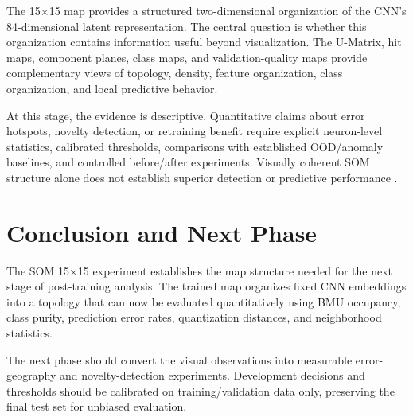\documentclass[11pt]{article}
\begin{document}
The 15$\times$15 map provides a structured two-dimensional organization of the
CNN's 84-dimensional latent representation. The central question is whether
this organization contains information useful beyond visualization. The
U-Matrix, hit maps, component planes, class maps, and validation-quality maps
provide complementary views of topology, density, feature organization, class
organization, and local predictive behavior.

At this stage, the evidence is descriptive. Quantitative claims about error
hotspots, novelty detection, or retraining benefit require explicit neuron-level
statistics, calibrated thresholds, comparisons with established OOD/anomaly
baselines, and controlled before/after experiments. Visually coherent SOM
structure alone does not establish superior detection or predictive performance
\cite{hendrycks2017baseline,lee2018mahalanobis}.

\section{Conclusion and Next Phase}

The SOM 15$\times$15 experiment establishes the map structure needed for the
next stage of post-training analysis. The trained map organizes fixed CNN
embeddings into a topology that can now be evaluated quantitatively using BMU
occupancy, class purity, prediction error rates, quantization distances, and
neighborhood statistics.

The next phase should convert the visual observations into measurable
error-geography and novelty-detection experiments. Development decisions and
thresholds should be calibrated on training/validation data only, preserving
the final test set for unbiased evaluation.

\printbibliography[title={References}]
\end{document}
